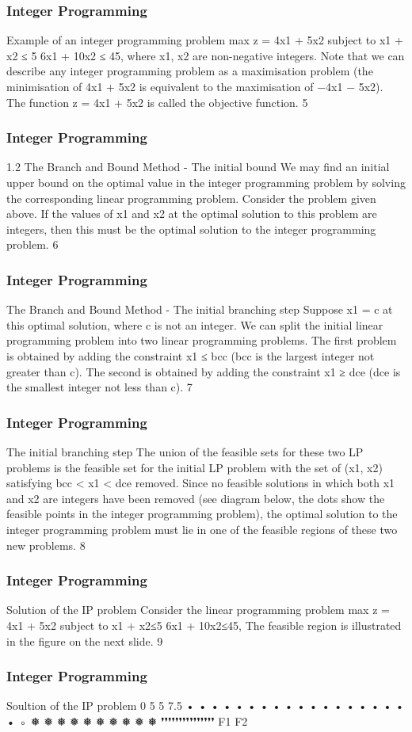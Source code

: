 \begin{frame} 
\frametitle{Integer Programming}     


Example of an integer programming problem
max z = 4x1 + 5x2
subject to
x1 + x2 ≤ 5
6x1 + 10x2 ≤ 45,
where x1, x2 are non-negative integers.
Note that we can describe any integer programming problem as a
maximisation problem (the minimisation of 4x1 + 5x2 is equivalent
to the maximisation of −4x1 − 5x2). The function z = 4x1 + 5x2 is
called the objective function.
5 \end{frame}  \begin{frame} \frametitle{Integer Programming}     
1.2 The Branch and Bound Method - The initial bound
We may find an initial upper bound on the optimal value in the
integer programming problem by solving the corresponding linear
programming problem.
Consider the problem given above. If the values of x1 and x2 at the
optimal solution to this problem are integers, then this must be the
optimal solution to the integer programming problem.
6 \end{frame}  \begin{frame} \frametitle{Integer Programming}     
The Branch and Bound Method - The initial branching
step
Suppose x1 = c at this optimal solution, where c is not an integer.
We can split the initial linear programming problem into two linear
programming problems.
The first problem is obtained by adding the constraint x1 ≤ bcc
(bcc is the largest integer not greater than c).
The second is obtained by adding the constraint x1 ≥ dce (dce is
the smallest integer not less than c).
7 \end{frame}  \begin{frame} \frametitle{Integer Programming}     
The initial branching step
The union of the feasible sets for these two LP problems is the
feasible set for the initial LP problem with the set of (x1, x2)
satisfying bcc < x1 < dce removed.
Since no feasible solutions in which both x1 and x2 are integers
have been removed (see diagram below, the dots show the feasible
points in the integer programming problem), the optimal solution
to the integer programming problem must lie in one of the feasible
regions of these two new problems.
8 \end{frame}  \begin{frame} \frametitle{Integer Programming}     
Solution of the IP problem
Consider the linear programming problem
max z = 4x1 + 5x2
subject to
x1 + x2≤5
6x1 + 10x2≤45,
The feasible region is illustrated in the figure on the next slide.
9 \end{frame}  \begin{frame} \frametitle{Integer Programming}     
Soultion of the IP problem
0
5
5 7.5
• • • • • •
• • • • •
• • • •
• • •
•
◦
❅
❅
❅
❅
❅
❅
❅
❅
❅
❅
❜❜❜❜❜❜❜❜❜❜❜❜❜❜❜
F1
F2














\end{frame}
